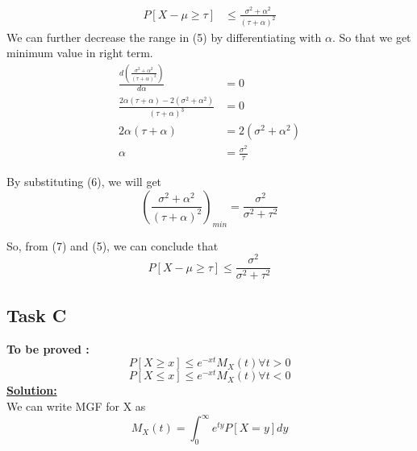\documentclass[12pt]{article}
\begin{document}
\begin{equation}
\begin{split}
    P[X-\mu \geq \tau]& \leq \frac{\sigma^2+\alpha^2}{(\tau+\alpha)^2}
\end{split}
\end{equation}
We can further decrease the range in (5) by differentiating with $\alpha$. So that we get minimum value in right term.
\begin{equation}
\begin{split}
    \frac{d(\frac{\sigma^2+\alpha^2}{(\tau+\alpha)^2})}{d\alpha}& = 0 \\
    \frac{2\alpha(\tau+\alpha)-2(\sigma^2+\alpha^2)}{(\tau+\alpha)^3}& = 0 \\
    2\alpha(\tau+\alpha)& = 2(\sigma^2+\alpha^2) \\
    \alpha& = \frac{\sigma^2}{\tau}
\end{split}
\end{equation}

By substituting (6), we will get
\begin{equation}
    (\frac{\sigma^2+\alpha^2}{(\tau+\alpha)^2})_{min} = \frac{\sigma^2}{\sigma^2+\tau^2}
\end{equation}

So, from (7) and (5), we can conclude that
\begin{equation}
    P[X-\mu \geq \tau] \leq \frac{\sigma^2}{\sigma^2+\tau^2}
\end{equation}

\subsection{Task C}
\textbf{To be proved :}
\begin{equation}
    P[X\geq x] \leq e^{-xt}M_X(t) \forall t>0
\end{equation}
\begin{equation}
    P[X\leq x] \leq e^{-xt}M_X(t) \forall t<0
\end{equation}
\textbf{\underline{Solution:}}\\
We can write MGF for X as
\begin{equation}
    M_X(t) = \int_0^\infty e^{ty}P[X=y]dy 
\end{equation}
\end{document}
